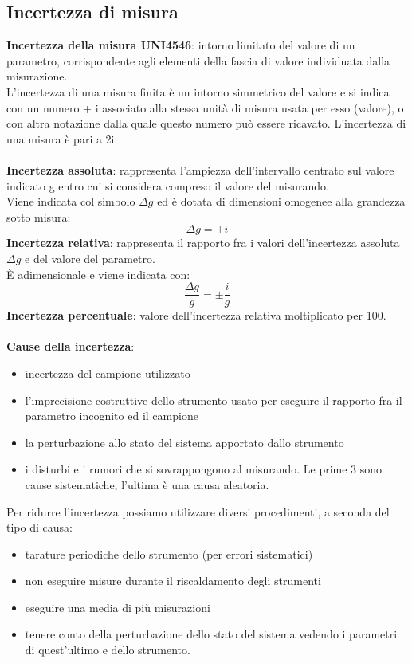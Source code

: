 \documentclass{article}
\begin{document}
\subsection{Incertezza di misura}
\textbf{Incertezza della misura UNI4546}: intorno limitato del valore di un parametro, 
corrispondente agli elementi della fascia di valore individuata dalla misurazione. \\
L'incertezza di una misura finita è un intorno simmetrico del valore e si indica con un 
numero + i associato alla stessa unità di misura usata per esso (valore), o con altra notazione 
dalla quale questo numero può essere ricavato. L’incertezza di una misura è pari a 2i.\\ \\
\textbf{Incertezza assoluta}: rappresenta l'ampiezza dell'intervallo centrato sul valore indicato g entro cui 
si considera compreso il valore del misurando.\\ Viene indicata col simbolo $\Delta g$ ed è dotata di 
dimensioni omogenee alla grandezza sotto misura: 
\begin{equation}
    \Delta g=\pm i
\end{equation}
\textbf{Incertezza relativa}: rappresenta il rapporto fra i valori dell'incertezza assoluta $\Delta g$ e del valore del 
parametro.\\ È adimensionale e viene indicata con:
\begin{equation}
    \frac{\Delta g}{g}=\pm \frac{i}{g}
\end{equation}
\textbf{Incertezza percentuale}: valore dell'incertezza relativa moltiplicato per 100. \\ \\
\textbf{Cause della incertezza}:
\begin{itemize}
    \item incertezza del campione utilizzato 
    \item l’imprecisione costruttive dello strumento usato per eseguire il rapporto fra il parametro 
incognito ed il campione 
    \item la perturbazione allo stato del sistema apportato dallo strumento
    \item i disturbi e i rumori che si sovrappongono al misurando. 
Le prime 3 sono cause sistematiche, l’ultima è una causa aleatoria. 
\end{itemize}
Per ridurre l'incertezza possiamo utilizzare diversi procedimenti, a seconda del tipo di causa: 
\begin{itemize}
    \item tarature periodiche dello strumento (per errori sistematici) 
    \item non eseguire misure durante il riscaldamento degli strumenti
    \item eseguire una media di più misurazioni
    \item tenere conto della perturbazione dello stato del sistema vedendo i parametri di 
quest’ultimo e dello strumento.
\end{itemize}
\end{document}
